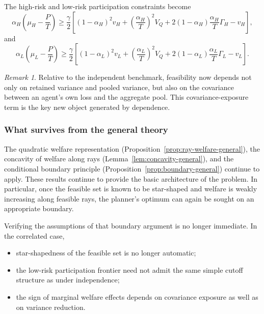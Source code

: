 \documentclass[a4paper,12pt]{article}
\theoremstyle{definition}
\theoremstyle{remark}
\newtheorem{remark}[theorem]{Remark}
\newcommand{\1}{\mathbf{1}}
\begin{document}
The high-risk and low-risk participation constraints become
\begin{equation}\label{eq:IRH-corr-new}
\alpha_H\!\left(\mu_H-\frac{P}{T}\right)
\ge
\frac{\gamma}{2}
\left[
(1-\alpha_H)^2v_H
+
\left(\frac{\alpha_H}{T}\right)^2V_Q
+
2(1-\alpha_H)\frac{\alpha_H}{T}\Gamma_H
-
v_H
\right],
\end{equation}
and
\begin{equation}\label{eq:IRL-corr-new}
\alpha_L\!\left(\mu_L-\frac{P}{T}\right)
\ge
\frac{\gamma}{2}
\left[
(1-\alpha_L)^2v_L
+
\left(\frac{\alpha_L}{T}\right)^2V_Q
+
2(1-\alpha_L)\frac{\alpha_L}{T}\Gamma_L
-
v_L
\right].
\end{equation}

\begin{remark}
Relative to the independent benchmark, feasibility now depends not only on
retained variance and pooled variance, but also on the covariance between an
agent's own loss and the aggregate pool. This covariance-exposure term is the
key new object generated by dependence.
\end{remark}

\subsubsection{What survives from the general theory}

The quadratic welfare representation (Proposition~\ref{prop:ray-welfare-general}), the concavity of welfare along rays (Lemma~\ref{lem:concavity-general}), and the conditional boundary principle (Proposition~\ref{prop:boundary-general}) continue to apply. These results continue to provide the basic architecture of the problem.
In particular, once the feasible set is known to be star-shaped and welfare is
weakly increasing along feasible rays, the planner's optimum can again be
sought on an appropriate boundary.

Verifying the assumptions of that boundary argument is no longer immediate. In the correlated case,
\begin{itemize}[leftmargin=2em]
    \item star-shapedness of the feasible set is no longer automatic;
    \item the low-risk participation frontier need not admit the same simple
    cutoff structure as under independence;
    \item the sign of marginal welfare effects depends on covariance exposure
    as well as on variance reduction.
\end{itemize}
\end{document}
